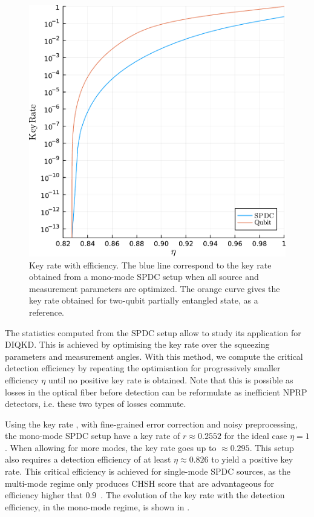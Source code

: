 \begin{figure}[ht!]
	\begin{center}
		\includegraphics[width=.95\textwidth]{chapters/deviceindependent/img/key_rate_spdc.pdf}
	\end{center}
	\caption{Key rate with efficiency. The blue line correspond to the key rate obtained from a mono-mode SPDC setup when all source and measurement parameters are optimized.
	The orange curve gives the key rate obtained for two-qubit partially entangled state, as a reference.}
	\label{fig:SPDC_kr}
\end{figure}

The statistics computed from the SPDC setup allow to study its application for DIQKD.
This is achieved by optimising the key rate over the squeezing parameters and measurement angles.
With this method, we compute the critical detection efficiency by repeating the optimisation for progressively smaller efficiency $\eta$ until no positive key rate is obtained.
Note that this is possible as losses in the optical fiber before detection can be reformulate as inefficient NPRP detectors, i.e. these two types of losses commute. 

Using the key rate , with fine-grained error correction and noisy preprocessing, the mono-mode SPDC setup have a key rate of $r\approx 0.2552$ for the ideal case $\eta=1$. 
When allowing for more modes, the key rate goes up to $\approx 0.295$.
This setup also requires a detection efficiency of at least $\eta\approx 0.826$ to yield a positive key rate.
This critical efficiency is achieved for single-mode SPDC sources, as the multi-mode regime only produces CHSH score that are advantageous for efficiency higher that $0.9$~\cite{Vivoli2015b}.
The evolution of the key rate with the detection efficiency, in the mono-mode regime, is shown in .



